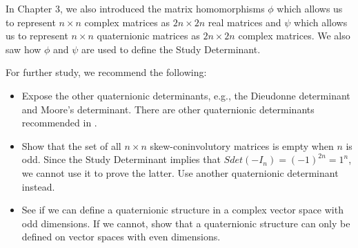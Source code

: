 In Chapter 3, we also introduced the matrix homomorphisms $\phi$ which allows us to represent $n \times n$ complex matrices as $2n\times 2n$ real matrices and $\psi$ which allows us to represent $n \times n$ quaternionic matrices as $2n\times 2n$ complex matrices. We also saw how $\phi$ and $\psi$ are used to define the Study Determinant. 

For further study, we recommend the following:

\begin{itemize}
	\item Expose the other quaternionic determinants, e.g., the Dieudonne determinant and Moore's determinant. There are other quaternionic determinants recommended in \cite{aslaksen}.
	\item Show that the set of all $n\times n$ skew-coninvolutory matrices is empty when $n$ is odd. Since the Study Determinant implies that $Sdet(-I_n) = (-1)^{2n} = 1^n$, we cannot use it to prove the latter. Use another quaternionic determinant instead.
	\item See if we can define a quaternionic structure in a complex vector space with odd dimensions. If we cannot, show that a quaternionic structure can only be defined on vector spaces with even dimensions.
\end{itemize}
